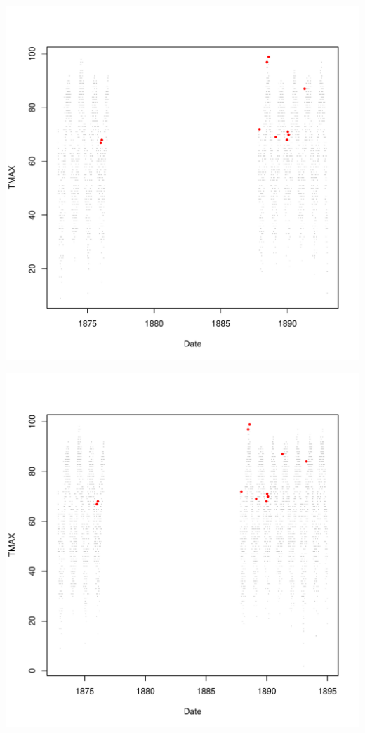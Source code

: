 \documentclass{article}\usepackage[]{graphicx}\usepackage[]{color}
\makeatletter
\def\maxwidth{ %
  \ifdim\Gin@nat@width>\linewidth
    \linewidth
  \else
    \Gin@nat@width
  \fi
}
\newenvironment{knitrout}{}{} %
\makeatother
\begin{document}
\begin{knitrout}
\includegraphics[width=\maxwidth]{figure/unnamed-chunk-4-6} 

\includegraphics[width=\maxwidth]{figure/unnamed-chunk-4-7} 


\end{knitrout}
\end{document}
